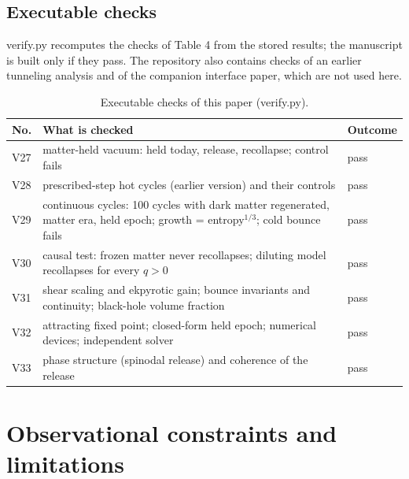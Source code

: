 \documentclass[pdflatex,sn-mathphys-num]{sn-jnl}
\begin{document}
\subsection{Executable checks}
verify.py recomputes the checks of Table 4 from the stored results; the manuscript is built only if they pass. The repository also contains checks of an earlier tunneling analysis and of the companion interface paper, which are not used here.

\begin{table}[htbp]\centering\footnotesize
\caption{Executable checks of this paper (verify.py).}
\begin{tabular}{>{\raggedright\arraybackslash}p{0.086\dimexpr\textwidth-6\tabcolsep\relax}>{\raggedright\arraybackslash}p{0.819\dimexpr\textwidth-6\tabcolsep\relax}>{\raggedright\arraybackslash}p{0.095\dimexpr\textwidth-6\tabcolsep\relax}}
\toprule
No. & What is checked & Outcome \\ \midrule
V27 & matter-held vacuum: held today, release, recollapse; control fails & pass \\
V28 & prescribed-step hot cycles (earlier version) and their controls & pass \\
V29 & continuous cycles: 100 cycles with dark matter regenerated, matter era, held epoch; growth = entropy$^{1/3}$; cold bounce fails & pass \\
V30 & causal test: frozen matter never recollapses; diluting model recollapses for every $q>0$ & pass \\
V31 & shear scaling and ekpyrotic gain; bounce invariants and continuity; black-hole volume fraction & pass \\
V32 & attracting fixed point; closed-form held epoch; numerical devices; independent solver & pass \\
V33 & phase structure (spinodal release) and coherence of the release & pass \\
\bottomrule
\end{tabular}
\end{table}
\section{Observational constraints and limitations}
\end{document}
